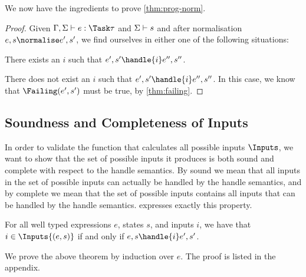 
We now have the ingredients to prove \cref{thm:prog-norm}.

\begin{proof}
  Given $\Gamma,\Sigma\infers e:\Task\tau$ and $\Sigma\vdash s$ and after
  normalisation $e,s \normalise e',s'$, we find ourselves in either one of the
  following situations:

  There exists an $i$ such that $e',s'\handle{i} e'',s''$.

  There does not exist an $i$ such that $e',s'\handle{i} e'',s''$. In this case, we
  know that $\Failing(e',s')$ must be true, by \cref{thm:failing}.
\end{proof}



\subsection{Soundness and Completeness of Inputs}

In order to validate the function that calculates all possible inputs $\Inputs$,
we want to show that the set of possible inputs it produces is both sound and complete with respect to the handle semantics.
By sound we mean that all inputs in the set of possible inputs can actually be handled by the handle semantics,
and by complete we mean that the set of possible inputs contains all inputs that can be handled by the handle semantics.
 expresses exactly this property.

\begin{theorem}
  For all well typed expressions $e$, states $s$, and inputs $i$,
  we have that $i \in \Inputs{(e,s)}$ if and only if $e,s \handle{i} e',s'$.
  \label{thm:safety-i}
\end{theorem}

We prove the above theorem by induction over $e$. The proof is listed in the
appendix.
